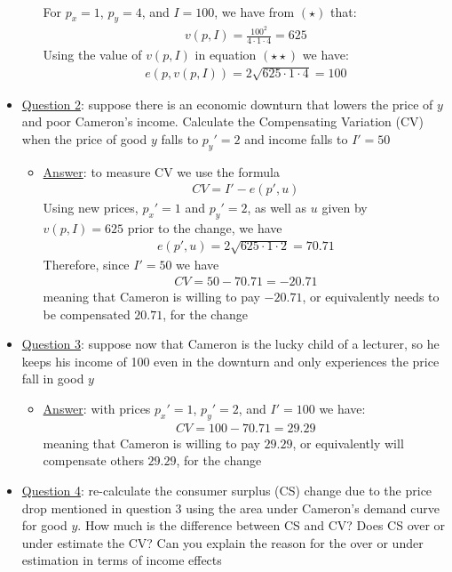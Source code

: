 \documentclass{article}
\begin{document}
\begin{itemize}
\begin{itemize}
\begin{align*}
    \end{align*}
    For $p_{x} = 1$, $p_{y} = 4$, and $I = 100$, we have from $(\star)$ that:
    \begin{gather*}
      v(p,I) = \frac{100^{2}}{4 \cdot 1 \cdot 4} = 625
    \end{gather*}
    Using the value of $v(p,I)$ in equation $(\star \star)$ we have:
    \begin{gather*}
      e(p,v(p,I)) = 2 \sqrt{625 \cdot 1 \cdot 4} = 100
    \end{gather*}
  \end{itemize}
  \item  \underline{Question 2}: suppose there is an economic downturn that lowers the price of $y$ and poor Cameron's income. Calculate the Compensating Variation (CV) when the price of good $y$ falls to $p_{y}' = 2$ and income falls to $I' = 50$
  \begin{itemize}
    \item  \underline{Answer}: to measure CV we use the formula
    \begin{gather*}
      CV = I' - e(p', u)
    \end{gather*}
    Using new prices, $p_{x}' = 1$ and $p_{y}' = 2$, as well as $u$ given by $v(p,I) = 625$ prior to the change, we have
    \begin{gather*}
      e(p',u) = 2 \sqrt{625 \cdot 1 \cdot 2} = 70.71
    \end{gather*}
    Therefore, since $I' = 50$ we have
    \begin{gather*}
      CV = 50 - 70.71 = -20.71
    \end{gather*}
    meaning that Cameron is willing to pay $-20.71$, or equivalently needs to be compensated $20.71$, for the change
  \end{itemize}
  \item  \underline{Question 3}: suppose now that Cameron is the lucky child of a lecturer, so he keeps his income of 100 even in the downturn and only experiences the price fall in good $y$
  \begin{itemize}
    \item  \underline{Answer}: with prices $p_{x}' = 1$, $p_{y}' = 2$, and $I' = 100$ we have:
    \begin{gather*}
      CV = 100 - 70.71 = 29.29
    \end{gather*}
    meaning that Cameron is willing to pay $29.29$, or equivalently will compensate others $29.29$, for the change
  \end{itemize}
  \item  \underline{Question 4}: re-calculate the consumer surplus (CS) change due to the price drop mentioned in question 3 using the area under Cameron's demand curve for good $y$. How much is the difference between CS and CV? Does CS over or under estimate the CV? Can you explain the reason for the over or under estimation in terms of income effects

\end{itemize}
\end{document}
